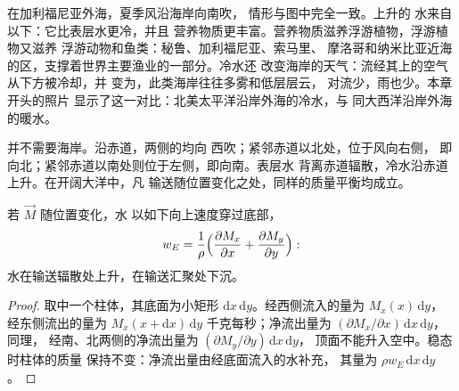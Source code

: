在加利福尼亚外海，夏季风沿海岸向南吹，
情形与图中完全一致。上升的
水来自以下：它比表层水更冷，并且
营养物质更丰富。营养物质滋养浮游植物，浮游植物又滋养
浮游动物和鱼类：秘鲁、加利福尼亚、索马里、
摩洛哥和纳米比亚近海的区，支撑着世界主要渔业的一部分。冷水还
改变海岸的天气：流经其上的空气从下方被冷却，并
变为，此类海岸往往多雾和低层层云，
对流少，雨也少。本章开头的照片
显示了这一对比：北美太平洋沿岸外海的冷水，与
同大西洋沿岸外海的暖水。

并不需要海岸。沿赤道，两侧的均向
西吹；紧邻赤道以北处，位于风向右侧，
即向北；紧邻赤道以南处则位于左侧，即向南。表层水
背离赤道辐散，冷水沿赤道上升。在开阔大洋中，凡
输送随位置变化之处，同样的质量平衡均成立。

\begin{proposition}[埃克曼抽吸]\label{prop:b1:ocean-circulation:pumping}
若 $\vec M$ 随位置变化，水
以如下向上速度穿过底部，
\[
  w_E = \frac{1}{\rho}\Bigl(\frac{\partial M_x}{\partial x} + \frac{\partial M_y}{\partial y}\Bigr):
\]
水在输送辐散处上升，在输送汇聚处下沉。
\end{proposition}

\begin{proof}
取中一个柱体，其底面为小矩形 $\mathrm dx\,\mathrm
dy$。经西侧流入的量为 $M_x(x)\,\mathrm dy$，
经东侧流出的量为 $M_x(x + \mathrm dx)\,\mathrm dy$ 千克每秒；净流出量为
$(\partial M_x/\partial x)\,\mathrm dx\,\mathrm dy$，同理，
经南、北两侧的净流出量为 $(\partial M_y/\partial y)\,\mathrm dx\,\mathrm dy$，
顶面不能升入空中。稳态时柱体的质量
保持不变：净流出量由经底面流入的水补充，
其量为 $\rho w_E\,\mathrm dx\,\mathrm dy$。
\end{proof}

